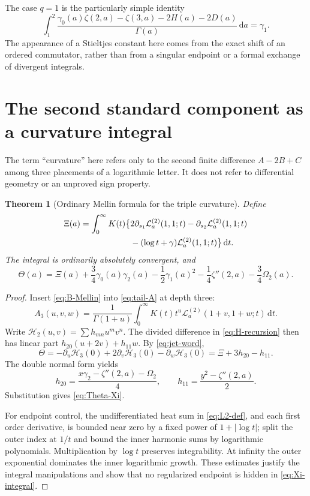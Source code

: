 \documentclass[11pt]{article}
\numberwithin{equation}{section}
\newtheorem{theorem}{Theorem}[section]
\theoremstyle{definition}
\newcommand{\HH}{\mathcal H}
\newcommand{\dd}{\,\mathrm d}
\begin{document}
The case $q=1$ is the particularly simple identity
\begin{equation}\label{eq:gamma1-integral}
 \int_1^2\frac{\gamma_0(a)\zeta(2,a)-\zeta(3,a)-2H(a)-2D(a)}{\Gamma(a)}\dd a
 =\gamma_1.
\end{equation}
The appearance of a Stieltjes constant here comes from the exact shift
of an ordered commutator, rather than from a singular endpoint or a
formal exchange of divergent integrals.

\section{The second standard component as a curvature integral}
\label{sec:curvature}
The term ``curvature'' here refers only to the second finite difference
$A-2B+C$ among three placements of a logarithmic letter. It does not
refer to differential geometry or an unproved sign property.

\begin{theorem}[Ordinary Mellin formula for the triple curvature]
\label{thm:curvature}
Define
\begin{align}\label{eq:Xi-integral}
 \Xi(a)=\int_0^\infty K(t)\bigl\{
 &2\partial_{s_1}\mathcal L_a^{(2)}(1,1;t)
   -\partial_{s_2}\mathcal L_a^{(2)}(1,1;t)\notag\\
 &-(\log t+\gamma)\mathcal L_a^{(2)}(1,1;t)\bigr\}\dd t.
\end{align}
The integral is ordinarily absolutely convergent, and
\begin{equation}\label{eq:Theta-Xi}
 \boxed{\displaystyle
 \Theta(a)=\Xi(a)+\frac34\gamma_0(a)\gamma_2(a)
                 -\frac12\gamma_1(a)^2-\frac14\zeta''(2,a)
                 -\frac34\Omega_2(a).}
\end{equation}
\end{theorem}
\begin{proof}
Insert \eqref{eq:B-Mellin} into \eqref{eq:tail-A} at depth three:
\[
 A_3(u,v,w)=\frac1{\Gamma(1+u)}\int_0^\infty
                  K(t)t^u\mathcal L_a^{(2)}(1+v,1+w;t)\dd t.
\]
Write $\HH_2(u,v)=\sum h_{mn}u^mv^n$. The divided difference in
\eqref{eq:H-recursion} then has linear part
$h_{20}(u+2v)+h_{11}w$. By \eqref{eq:jet-word},
\[
 \Theta=-\partial_u\HH_3(0)+2\partial_v\HH_3(0)-\partial_w\HH_3(0)
        =\Xi+3h_{20}-h_{11}.
\]
The double normal form yields
\[
 h_{20}=\frac{x\gamma_2-\zeta''(2,a)-\Omega_2}{4},\qquad
 h_{11}=\frac{y^2-\zeta''(2,a)}2.
\]
Substitution gives \eqref{eq:Theta-Xi}.

For endpoint control, the undifferentiated heat sum in
\eqref{eq:L2-def}, and each first order derivative, is bounded near zero
by a fixed power of $1+|\log t|$; split the outer index at $1/t$ and
bound the inner harmonic sums by logarithmic polynomials. Multiplication
by $\log t$ preserves integrability. At infinity the outer exponential
dominates the inner logarithmic growth. These estimates justify the
integral manipulations and show that no regularized endpoint is hidden
in \eqref{eq:Xi-integral}.
\end{proof}
\end{document}

